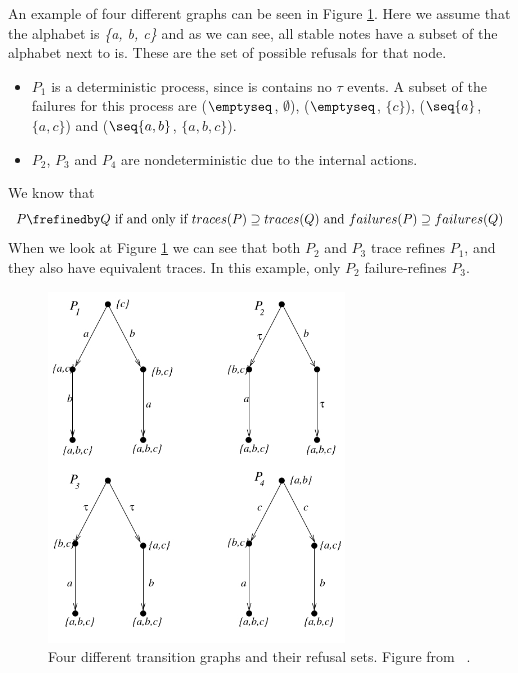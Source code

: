 An example of four different graphs can be seen in Figure \ref{fig:failures_graph}. Here we assume that the alphabet is \textit{\{a, b, c\}} and as we can see, all stable notes have a subset of the alphabet next to is. These are the set of possible refusals for that node. \\
\begin{itemize}
    \item $P_1$ is a deterministic process, since is contains no $\tau$ events. A subset of the failures for this process are ($\emptyseq$, $\emptyset$), ($\emptyseq$, $\{c\}$), ($\seq{a}$, $\{a,c\}$) and ($\seq{a,b}$, $\{a,b,c\}$).
    \item $P_2$, $P_3$ and $P_4$ are nondeterministic due to the internal actions.
\end{itemize}
We know that $$P \frefinedby Q \text{ if and only if } traces(P) \supseteq traces(Q) \text{ and } failures(P) \supseteq failures(Q)$$
When we look at Figure \ref{fig:failures_graph} we can see that both $P_2$ and $P_3$ trace refines $P_1$, and they also have equivalent traces. In this example, only $P_2$ failure-refines $P_3$.
\begin{figure}[h]
\centering
\includegraphics[width=0.7\textwidth]{figures/failures_graph.jpg}
\caption{Four different transition graphs and their refusal sets. Figure from ~\cite{Roscoe2010}.}
\label{fig:failures_graph}
\end{figure}
